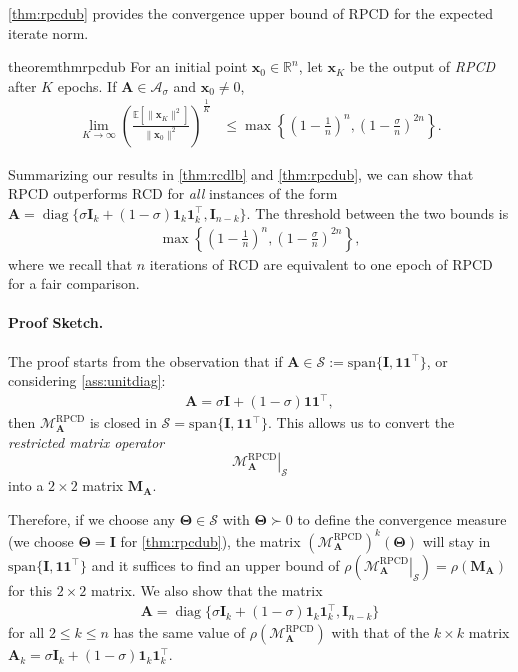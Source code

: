 \documentclass{article}
\theoremstyle{plain}
\theoremstyle{definition}
\theoremstyle{remark}
\def\bigopen#1{\left(#1\right)}
\def\bigset#1{\left\{#1\right\}}
\def\bigclosed#1{\left[#1\right]}
\renewcommand{\sp}{\mathrm{span}}
\newcommand{\mTheta}{\bm{\Theta}}
\newcommand{\RPCD}{\text{RPCD}} %
\newcommand{\MARPCD}{\mathcal{M}_{\bm{A}}^{\RPCD}} %
\def\vone{{\bm{1}}}
\def\vx{{\bm{x}}}
\def\mA{{\bm{A}}}
\def\mI{{\bm{I}}}
\def\mM{{\bm{M}}}
\def\gA{{\mathcal{A}}}
\def\gM{{\mathcal{M}}}
\def\gS{{\mathcal{S}}}
\newcommand{\E}{\mathbb{E}}
\newcommand{\R}{\mathbb{R}}
\DeclareMathOperator{\diag}{diag}
\begin{document}
\cref{thm:rpcdub} provides the convergence upper bound of RPCD for the expected iterate norm.
\begin{restatable}{theorem}{thmrpcdub}
    \label{thm:rpcdub}
    For an initial point $\vx_0\in \R^{n}$, let $\vx_K$ be the output of \emph{RPCD} after $K$ epochs. If $\mA \in \gA_{\sigma}$ and $\vx_0 \ne 0$, %
    \begin{align*}
        \lim_{K \to \infty} \bigopen{\frac{\E\bigclosed{\|\vx_K\|^2}}{\|\vx_0\|^2}}^{\!\!\frac{1}{K}} \!\!\!\! &\le \max \bigset{\bigopen{1 - \frac{1}{n}}^n\!\!\!, \bigopen{1 - \frac{\sigma}{n}}^{2n}}.
    \end{align*}
\end{restatable}

Summarizing our results in \cref{thm:rcdlb} and \cref{thm:rpcdub}, we can show that RPCD outperforms RCD for \emph{all} instances of the form $\mA = \diag \{ \sigma \mI_k + (1 - \sigma) \vone_k \vone_k^{\top}, \mI_{n-k} \}$.
The threshold between the two bounds is
\begin{align}
    \max \bigset{\bigopen{1 - \frac{1}{n}}^n, \bigopen{1 - \frac{\sigma}{n}}^{2n}}, \label{eq:thres}
\end{align}
where we recall that $n$ iterations of RCD are equivalent to one epoch of RPCD for a fair comparison.

\paragraph{Proof Sketch.}
The proof starts from the observation that if $\mA \in \gS := \sp \{ \mI, \vone \vone^{\top} \}$, or considering \cref{ass:unitdiag}:
\begin{align}
    \mA = \sigma \mI + (1 - \sigma) \vone \vone^{\top}, \label{eq:A}
\end{align}
then $\MARPCD$ is closed in $\gS = \sp \{ \mI, \vone \vone^{\top} \}$.
This allows us to convert the \emph{restricted matrix operator}
\[ \left. \MARPCD \right|_{\gS} \]
into a $2 \times 2$ matrix $\mM_{\mA}$.

Therefore, if we choose any $\mTheta \in \gS$ with $\mTheta \succ 0$ to define the convergence measure (we choose $\mTheta = \mI$ for \cref{thm:rpcdub}), the matrix $\bigopen{\gM_{\mA}^{\text{RPCD}}}^{k}(\mTheta)$ will stay in $\sp \{ \mI, \vone \vone^{\top} \}$ and it suffices to find an upper bound of $\rho (\left. \MARPCD \right|_{\gS}) = \rho(\mM_{\mA})$ for this $2 \times 2$ matrix.
We also show that the matrix
\begin{align*}
    \mA = \diag\{ \sigma \mI_{k} + (1 - \sigma) \vone_{k} \vone_{k}^{\top}, \mI_{n-k} \}
\end{align*}
for all $2 \le k \le n$ has the same value of $\rho(\MARPCD)$ with that of the $k \times k$ matrix $\mA_{k} = \sigma \mI_{k} + (1 - \sigma) \vone_{k} \vone_{k}^{\top}$.
\end{document}
